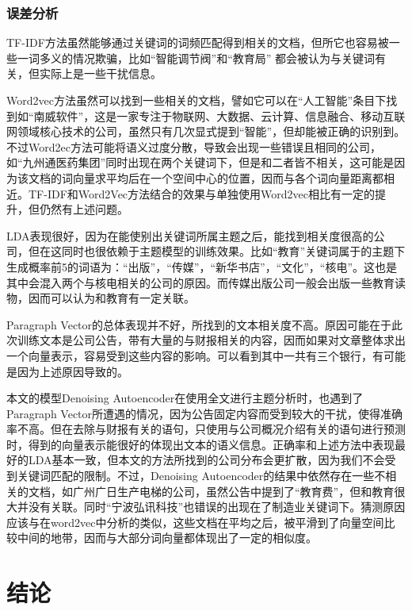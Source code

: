 \documentclass[UTF8,11pt,a4paper,nofonts]{ctexart}
\begin{document}
\subsubsection{误差分析}

TF-IDF方法虽然能够通过关键词的词频匹配得到相关的文档，但所它也容易被一些一词多义的情况欺骗，比如“智能调节阀”和“教育局” 都会被认为与关键词有关，但实际上是一些干扰信息。

Word2vec方法虽然可以找到一些相关的文档，譬如它可以在“人工智能”条目下找到如“南威软件”，这是一家专注于物联网、大数据、云计算、信息融合、移动互联网领域核心技术的公司，虽然只有几次显式提到“智能”，但却能被正确的识别到。不过Word2ec方法可能将语义过度分散，导致会出现一些错误且相同的公司，如“九州通医药集团”同时出现在两个关键词下，但是和二者皆不相关，这可能是因为该文档的词向量求平均后在一个空间中心的位置，因而与各个词向量距离都相近。TF-IDF和Word2Vec方法结合的效果与单独使用Word2vec相比有一定的提升，但仍然有上述问题。

LDA表现很好，因为在能使别出关键词所属主题之后，能找到相关度很高的公司，但在这同时也很依赖于主题模型的训练效果。比如“教育”关键词属于的主题下生成概率前5的词语为：“出版”，“传媒”，“新华书店”，“文化”，“核电”。这也是其中会混入两个与核电相关的公司的原因。而传媒出版公司一般会出版一些教育读物，因而可以认为和教育有一定关联。

Paragraph Vector的总体表现并不好，所找到的文本相关度不高。原因可能在于此次训练文本是公司公告，带有大量的与财报相关的内容，因而如果对文章整体求出一个向量表示，容易受到这些内容的影响。可以看到其中一共有三个银行，有可能是因为上述原因导致的。

本文的模型Denoising Autoencoder在使用全文进行主题分析时，也遇到了Paragraph Vector所遭遇的情况，因为公告固定内容而受到较大的干扰，使得准确率不高。但在去除与财报有关的语句，只使用与公司概况介绍有关的语句进行预测时，得到的向量表示能很好的体现出文本的语义信息。正确率和上述方法中表现最好的LDA基本一致，但本文的方法所找到的公司分布会更扩散，因为我们不会受到关键词匹配的限制。不过，Denoising Autoencoder的结果中依然存在一些不相关的文档，如广州广日生产电梯的公司，虽然公告中提到了“教育费”，但和教育很大并没有关联。同时“宁波弘讯科技”也错误的出现在了制造业关键词下。猜测原因应该与在word2vec中分析的类似，这些文档在平均之后，被平滑到了向量空间比较中间的地带，因而与大部分词向量都体现出了一定的相似度。




\section{结论}
\end{document}
